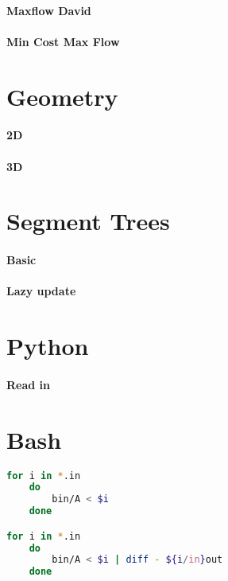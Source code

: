 \documentclass[a4paper]{article}
\begin{document}
\paragraph{Maxflow David} \hfill

\paragraph{Min Cost Max Flow} \hfill


\newpage
\section{Geometry}
\paragraph{2D} \hfill

\paragraph{3D} \hfill


\newpage
\section{Segment Trees}
\paragraph{Basic} \hfill


\newpage
\paragraph{Lazy update} \hfill

\section{Python}
\paragraph{Read in} \hfill


\section{Bash}
\begin{lstlisting}[language=bash]
for i in *.in
	do
		bin/A < $i
	done

for i in *.in
	do
		bin/A < $i | diff - ${i/in}out
	done
\end{lstlisting}
\end{document}

